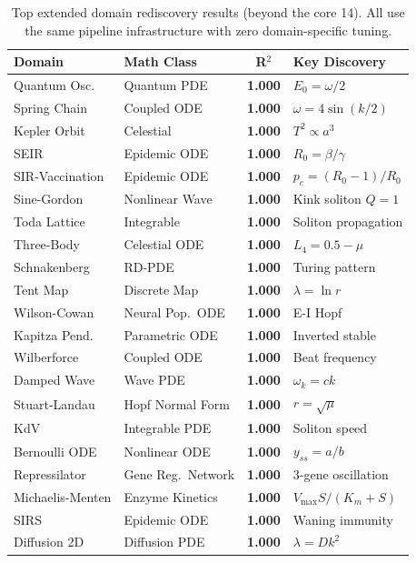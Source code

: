 \documentclass{article}
\begin{document}
\begin{table}[h]
\centering
\caption{Top extended domain rediscovery results (beyond the core 14).
All use the same pipeline infrastructure with zero domain-specific tuning.}
\label{tab:extended}
\small
\begin{tabular}{llcl}
\toprule
Domain & Math Class & R$^2$ & Key Discovery \\
\midrule
Quantum Osc. & Quantum PDE & \textbf{1.000} & $E_0 = \omega/2$ \\
Spring Chain & Coupled ODE & \textbf{1.000} & $\omega = 4\sin(k/2)$ \\
Kepler Orbit & Celestial & \textbf{1.000} & $T^2 \propto a^3$ \\
SEIR & Epidemic ODE & \textbf{1.000} & $R_0 = \beta/\gamma$ \\
SIR-Vaccination & Epidemic ODE & \textbf{1.000} & $p_c = (R_0{-}1)/R_0$ \\
Sine-Gordon & Nonlinear Wave & \textbf{1.000} & Kink soliton $Q = 1$ \\
Toda Lattice & Integrable & \textbf{1.000} & Soliton propagation \\
Three-Body & Celestial ODE & \textbf{1.000} & $L_4 = 0.5 - \mu$ \\
Schnakenberg & RD-PDE & \textbf{1.000} & Turing pattern \\
Tent Map & Discrete Map & \textbf{1.000} & $\lambda = \ln r$ \\
Wilson-Cowan & Neural Pop.\ ODE & \textbf{1.000} & E-I Hopf \\
Kapitza Pend. & Parametric ODE & \textbf{1.000} & Inverted stable \\
Wilberforce & Coupled ODE & \textbf{1.000} & Beat frequency \\
Damped Wave & Wave PDE & \textbf{1.000} & $\omega_k = ck$ \\
Stuart-Landau & Hopf Normal Form & \textbf{1.000} & $r = \sqrt{\mu}$ \\
KdV & Integrable PDE & \textbf{1.000} & Soliton speed \\
Bernoulli ODE & Nonlinear ODE & \textbf{1.000} & $y_{ss} = a/b$ \\
Repressilator & Gene Reg.\ Network & \textbf{1.000} & 3-gene oscillation \\
Michaelis-Menten & Enzyme Kinetics & \textbf{1.000} & $V_{\max}S/(K_m{+}S)$ \\
SIRS & Epidemic ODE & \textbf{1.000} & Waning immunity \\
Diffusion 2D & Diffusion PDE & \textbf{1.000} & $\lambda = Dk^2$ \\

\end{tabular}
\end{table}
\end{document}

